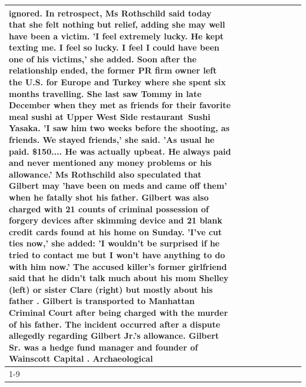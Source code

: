 \begin{table}[H]
\begin{tabular}{lllrlllll}
ignored. In retrospect, Ms Rothschild said today that she felt nothing but relief, adding she may well have been a victim. 'I feel extremely lucky. He kept texting me. I feel so lucky. I feel I could have been one of his victims,' she added. Soon after the relationship ended, the former PR firm owner left the U.S. for Europe and Turkey where she spent six months  travelling. She last saw Tommy in late December when they met as friends for their favorite meal sushi at Upper West Side restaurant Sushi Yasaka. 'I saw him two weeks before the shooting, as friends. We stayed friends,' she said. 'As usual he paid. \$150.... He was actually upbeat. He always paid and never mentioned any money problems or his allowance.' Ms Rothschild also speculated that Gilbert may 'have been on meds and came off them' when he fatally shot his father. Gilbert was also charged with 21 counts of criminal possession of forgery devices after skimming device and 21 blank credit cards found at his home on Sunday. 'I've cut ties now,' she added: 'I wouldn’t be surprised if he tried to contact me but I won’t have anything to do with him now.' The accused killer's former girlfriend said that he didn't talk much about his mom Shelley (left) or sister Clare (right) but mostly about his father . Gilbert is transported to Manhattan Criminal Court  after being charged with the murder of his father. The incident occurred after a dispute allegedly regarding Gilbert Jr.'s allowance. Gilbert Sr. was a hedge fund manager and founder of Wainscott Capital . Archaeological \\
\cline{1-9}

\end{tabular}
\end{table}
